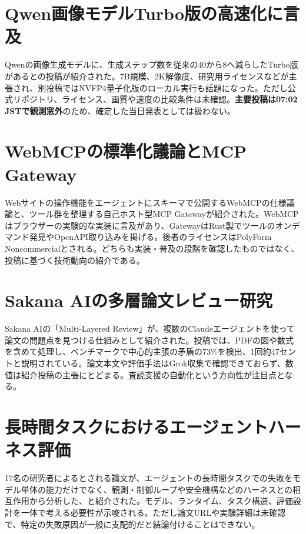 \section{Qwen画像モデルTurbo版の高速化に言及}
Qwenの画像生成モデルに、生成ステップ数を従来の40から8へ減らしたTurbo版があるとの投稿が紹介された。7B規模、2K解像度、研究用ライセンスなどが主張され、別投稿ではNVFP4量子化版のローカル実行も話題になった。ただし公式リポジトリ、ライセンス、画質や速度の比較条件は未確認。\textbf{主要投稿は07:02 JSTで観測窓外}のため、確定した当日発表としては扱わない。

\section{WebMCPの標準化議論とMCP Gateway}
Webサイトの操作機能をエージェントにスキーマで公開するWebMCPの仕様議論と、ツール群を整理する自己ホスト型MCP Gatewayが紹介された。WebMCPはブラウザーの実験的な実装に言及があり、GatewayはRust製でツールのオンデマンド発見やOpenAPI取り込みを掲げる。後者のライセンスはPolyForm Noncommercialとされる。どちらも実装・普及の段階を確認したものではなく、投稿に基づく技術動向の紹介である。

\section{Sakana AIの多層論文レビュー研究}
Sakana AIの「Multi-Layered Review」が、複数のClaudeエージェントを使って論文の問題点を見つける仕組みとして紹介された。投稿では、PDFの図や数式を含めて処理し、ベンチマークで中心的主張の矛盾の73\%を検出、1回約47セントと説明されている。論文本文や評価手法はGrok収集で確認できておらず、数値は紹介投稿の主張にとどまる。査読支援の自動化という方向性が注目点となる。

\section{長時間タスクにおけるエージェントハーネス評価}
17名の研究者によるとされる論文が、エージェントの長時間タスクでの失敗をモデル単体の能力だけでなく、観測・制御ループや安全機構などのハーネスとの相互作用から分析した、と紹介された。モデル、ランタイム、タスク構造、評価設計を一体で考える必要性が示唆される。ただし論文URLや実験詳細は未確認で、特定の失敗原因が一般に支配的だと結論付けることはできない。

